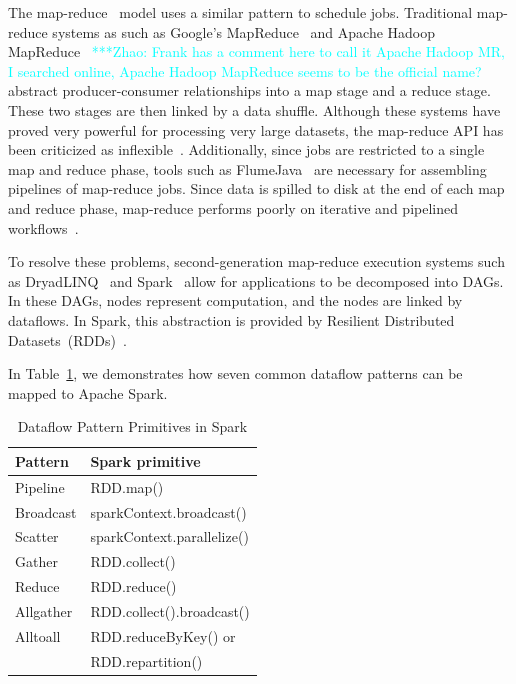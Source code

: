 \documentclass[conference]{IEEEtran}
\newcommand{\zhaonote}[1]{{\textcolor{cyan}    { ***Zhao:      #1 }}}
\newcommand{\zhaonote}[1]{}
\begin{document}
The map-reduce~\cite{dean04} model uses a similar pattern to schedule jobs. Traditional map-reduce
systems as such as Google's MapReduce~\cite{dean04} and Apache Hadoop MapReduce~\cite{HADOOP} 
\zhaonote{Frank has a comment here to call it Apache Hadoop MR, I searched online, Apache Hadoop MapReduce
seems to be the official name?}
abstract producer-consumer relationships into a map stage and a reduce stage. These two stages are then
linked by a data shuffle. Although these systems have proved very powerful for processing very
large datasets, the map-reduce API has been criticized as inflexible~\cite{dewitt08}.
Additionally, since jobs are restricted to a single map and reduce phase, tools such as
FlumeJava~\cite{chambers10} are necessary for assembling pipelines of map-reduce jobs. Since
data is spilled to disk at the end of each map and reduce phase, map-reduce performs poorly
on iterative and pipelined workflows~\cite{zaharia12}.

To resolve these problems, second-generation map-reduce execution systems such as
DryadLINQ~\cite{yu08} and Spark~\cite{zaharia12} allow for applications to be decomposed into
DAGs. In these DAGs, nodes represent computation, and the nodes are
linked by dataflows. In Spark, this abstraction is provided by Resilient Distributed Datasets~(RDDs)~\cite{zaharia12}.

In Table~\ref{tb:Patterns}, we demonstrates how seven common dataflow patterns can be mapped
to Apache Spark.

\begin{table}[h]
  \begin{center}
  \caption{Dataflow Pattern Primitives in Spark}
    \begin{small}
    \begin{tabular}{ | p{1.8cm} | p{5.5cm} |}
    \hline
    Pattern & Spark primitive \\
    \hline \hline
    Pipeline & RDD.map()  \\ 
    Broadcast & sparkContext.broadcast() \\   
    Scatter & sparkContext.parallelize() \\ 
    Gather & RDD.collect() \\ 
    Reduce & RDD.reduce() \\ 
    Allgather & RDD.collect().broadcast() \\ 
    Alltoall & RDD.reduceByKey() or \\
 & RDD.repartition() \\ 
    \hline
    \end{tabular}
    \end{small}   
  \label{tb:Patterns}     	
  \end{center}
\end{table}
\end{document}
